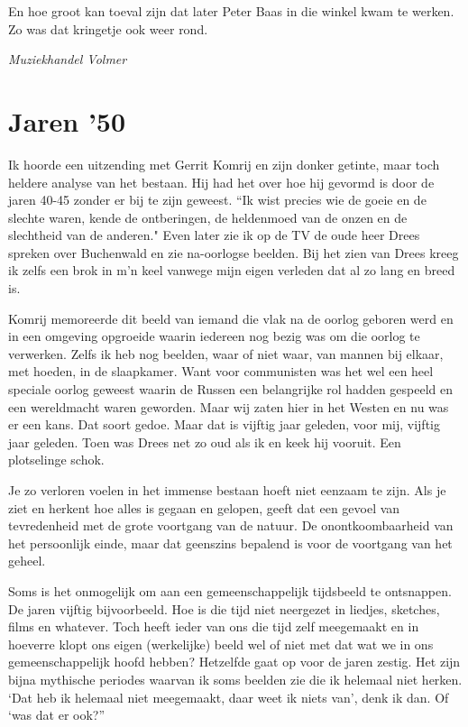 \documentclass[10pt,twoside,openright]{memoir}
\begin{document}
En hoe groot kan toeval zijn dat later Peter Baas in die winkel kwam te werken. Zo was dat kringetje ook weer rond. 

\emph{Muziekhandel Volmer}

\chapter{Jaren '50} %
\label{cha:jaren50}

Ik hoorde een uitzending met Gerrit Komrij en zijn donker getinte, maar toch heldere analyse van het bestaan. Hij had het over hoe hij gevormd is door de jaren 40-45 zonder er bij te zijn geweest. “Ik wist precies wie de goeie en de slechte waren, kende de ontberingen, de heldenmoed van de onzen en de slechtheid van de anderen." Even later zie ik op de TV de oude heer Drees spreken over Buchenwald en zie na-oorlogse beelden. Bij het zien van Drees kreeg ik zelfs een brok in m’n keel vanwege mijn eigen verleden dat al zo lang en breed is. 

Komrij memoreerde dit beeld van iemand die vlak na de oorlog geboren werd en in een omgeving opgroeide waarin iedereen nog bezig was om die oorlog te verwerken. Zelfs ik heb nog beelden, waar of niet waar, van mannen bij elkaar, met hoeden, in de slaapkamer. Want voor communisten was het wel een heel speciale oorlog geweest waarin de Russen een belangrijke rol hadden gespeeld en een wereldmacht waren geworden. Maar wij zaten hier in het Westen en nu was er een kans. Dat soort gedoe. Maar dat is vijftig jaar geleden, voor mij, vijftig jaar geleden. Toen was Drees net zo oud als ik en keek hij vooruit. Een plotselinge schok.

Je zo verloren voelen in het immense bestaan hoeft niet eenzaam te zijn. Als je ziet en herkent hoe alles is gegaan en gelopen, geeft dat een gevoel van tevredenheid met de grote voortgang van de natuur. De onontkoombaarheid van het persoonlijk einde, maar dat geenszins bepalend is voor de voortgang van het geheel.

Soms is het onmogelijk om aan een gemeenschappelijk tijdsbeeld te ontsnappen. De jaren vijftig bijvoorbeeld. Hoe is die tijd niet neergezet in liedjes, sketches, films en whatever. Toch heeft ieder van ons die tijd zelf meegemaakt en in hoeverre klopt ons eigen (werkelijke) beeld wel of niet met dat wat we in ons gemeenschappelijk hoofd hebben? Hetzelfde gaat op voor de jaren zestig. Het zijn bijna mythische periodes waarvan ik soms beelden zie die ik helemaal niet herken. ‘Dat heb ik helemaal niet meegemaakt, daar weet ik niets van’, denk ik dan. Of ‘was dat er ook?”
\end{document}
